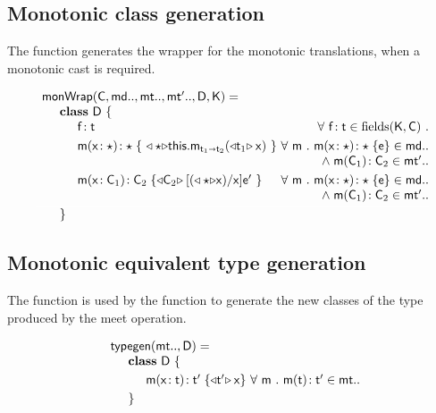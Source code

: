 \documentclass[sigconf]{acmart}
\begin{document}
\subsection{Monotonic class generation}\label{classgen}

The  function generates the wrapper for the monotonic translations,
when a monotonic cast is required.

\footnotesize
\[\begin{array}{l@{~}r@{}r@{~}r@{~}r@{~}rr}
\arrayrulecolor{white}
\classgen{\C, \md.., \mt.., \mtp.., \D, \K}= \\
\SP \class~\D~\{ \\
\SPP \Fdef\f\t & \All {{\f}\!:{\t} \in \text{fields}(\K,\C)}
\\[1mm]\hline
\SPP \Mdef\m\x\any\any {~\MonCast\any{\KCall\this\m{\MonCast{\t[1]}\x}{\t[1]}{\t[2]}}~}
&     \All \m \Mdef\m\x{\any}{\any}\e\in\md.. \\&\wedge\; \Mtype\m{\C_1}{\C_2}\in{\mtp..}
\\[1mm]\hline
\SPP \Mdef\m\x{\C_1}{\C_2} {\MonCast{\C_2}{[{(\MonCast{\any}\x)}/\x]\ep}~}
&     \All \m \Mdef\m\x{\any}{\any}\e\in\md.. \\&\wedge\; \Mtype\m{\C_1}{\C_2}\in\mtp.. 
\\[1mm]\hline
\SP\}
\end{array}
\]
\normalsize





\subsection{Monotonic equivalent type generation}\label{typegen}

The  function is used by the  function to generate the new classes
of the type produced by the meet operation.

\footnotesize
\[\begin{array}{l@{~}r@{}r@{~}r@{~}r@{~}rr}
\arrayrulecolor{white}
\typegen{\mt..}{\D} = \\
\SP \class~\D~\{
\\[1mm]
\SPP \Mdef\m\x\t\tp {{\MonCast\tp{\x}}} 
&
\All m \Mtype\m\t\tp\in\mt..
\\[1mm]
\SP\}
\end{array}
\]
\normalsize



\end{document}
